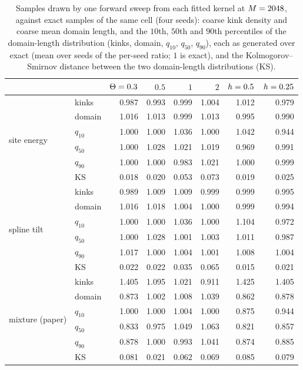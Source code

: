 \begin{table}[t]
\setlength{\tabcolsep}{6pt}
\centering
\footnotesize
\caption{Samples drawn by one forward sweep from each fitted kernel at $M=2048$, against exact samples of the same cell (four seeds): coarse kink density and coarse mean domain length, and the $10$th, $50$th and $90$th percentiles of the domain-length distribution (kinks, domain, $q_{10}$, $q_{50}$, $q_{90}$), each as generated over exact (mean over seeds of the per-seed ratio; $1$ is exact), and the Kolmogorov--Smirnov distance between the two domain-length distributions (KS).}
\label{tab:fieldsamples}
\begin{tabular}{@{}llrrrrrr@{}}
\toprule
 & & $\Theta=0.3$ & $0.5$ & $1$ & $2$ & $h=0.5$ & $h=0.25$ \\
\midrule
\multirow{6}{*}{site energy} & kinks & 0.987 & 0.993 & 0.999 & 1.004 & 1.012 & 0.979 \\
 & domain & 1.016 & 1.013 & 0.999 & 1.013 & 0.995 & 0.990 \\
 & $q_{10}$ & 1.000 & 1.000 & 1.036 & 1.000 & 1.042 & 0.944 \\
 & $q_{50}$ & 1.000 & 1.028 & 1.021 & 1.019 & 0.969 & 0.991 \\
 & $q_{90}$ & 1.000 & 1.000 & 0.983 & 1.021 & 1.000 & 0.999 \\
 & KS & 0.018 & 0.020 & 0.053 & 0.073 & 0.019 & 0.025 \\
\midrule
\multirow{6}{*}{spline tilt} & kinks & 0.989 & 1.009 & 1.009 & 0.999 & 0.999 & 0.995 \\
 & domain & 1.016 & 1.018 & 1.004 & 1.000 & 0.999 & 0.994 \\
 & $q_{10}$ & 1.000 & 1.000 & 1.036 & 1.000 & 1.104 & 0.972 \\
 & $q_{50}$ & 1.000 & 1.028 & 1.001 & 1.003 & 1.011 & 0.987 \\
 & $q_{90}$ & 1.017 & 1.000 & 1.004 & 1.001 & 1.008 & 1.004 \\
 & KS & 0.022 & 0.022 & 0.035 & 0.065 & 0.015 & 0.021 \\
\midrule
\multirow{6}{*}{mixture (paper)} & kinks & 1.405 & 1.095 & 1.021 & 0.911 & 1.425 & 1.405 \\
 & domain & 0.873 & 1.002 & 1.008 & 1.039 & 0.862 & 0.878 \\
 & $q_{10}$ & 1.000 & 1.000 & 1.004 & 1.000 & 0.875 & 0.944 \\
 & $q_{50}$ & 0.833 & 0.975 & 1.049 & 1.063 & 0.821 & 0.857 \\
 & $q_{90}$ & 0.878 & 1.000 & 0.993 & 1.041 & 0.874 & 0.885 \\
 & KS & 0.081 & 0.021 & 0.062 & 0.069 & 0.085 & 0.079 \\
\bottomrule
\end{tabular}
\end{table}
